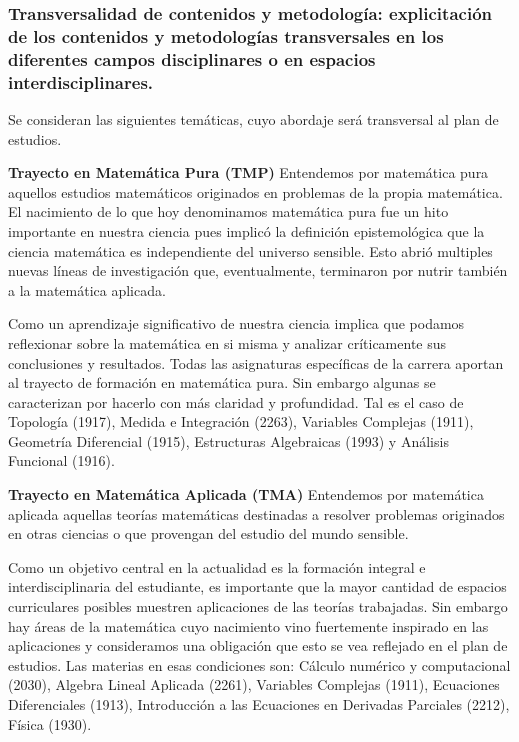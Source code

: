 \documentclass[a4paper, 12pt]{article}
\begin{document}
\subsubsection{Transversalidad de contenidos y metodología: explicitación de los contenidos y metodologías transversales en los diferentes campos disciplinares o en espacios interdisciplinares.}

Se consideran las siguientes temáticas, cuyo abordaje será transversal al plan de estudios. 


\begin{description}


\item{\textbf{Trayecto en Matemática Pura (TMP)}} Entendemos por matemática pura aquellos estudios  matemáticos originados en problemas de la propia matemática. El nacimiento de lo que hoy denominamos  matemática pura fue un hito importante en  nuestra ciencia pues implicó la definición epistemológica que la ciencia matemática es independiente del universo sensible. Esto abrió multiples nuevas líneas de investigación que, eventualmente, terminaron por nutrir también a la matemática aplicada. 

Como un aprendizaje significativo de nuestra ciencia implica que podamos reflexionar sobre la matemática en si  misma y analizar críticamente sus conclusiones y resultados. Todas las asignaturas específicas  de la carrera aportan al trayecto de formación en matemática pura. Sin embargo algunas se caracterizan por hacerlo con más claridad y profundidad. Tal es el caso de Topología (1917), Medida e Integración (2263), Variables Complejas (1911), Geometría Diferencial (1915), Estructuras Algebraicas (1993) y Análisis Funcional (1916). 

 
\item{\textbf{Trayecto en Matemática Aplicada (TMA)}} Entendemos por matemática aplicada aquellas teorías matemáticas destinadas a resolver problemas originados en  otras ciencias o que provengan del estudio  del  mundo sensible. 

Como un objetivo central en la actualidad es la formación integral e interdisciplinaria del estudiante, es importante que la mayor cantidad de  espacios curriculares posibles muestren aplicaciones de las teorías trabajadas. Sin embargo hay áreas de la matemática cuyo  nacimiento
vino fuertemente inspirado en las aplicaciones y consideramos una obligación que esto se vea reflejado en el plan de estudios. Las materias en esas condiciones son: Cálculo numérico y computacional (2030), Algebra Lineal Aplicada (2261), Variables Complejas (1911), Ecuaciones Diferenciales (1913), Introducción a las Ecuaciones en Derivadas Parciales (2212), Física (1930).





\end{description}
\end{document}
